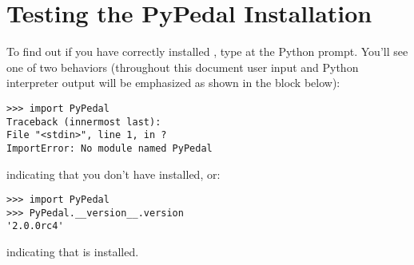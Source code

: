 \section{Testing the PyPedal Installation}\label{sec:installation-testing}
To find out if you have correctly installed \PyPedal{}, type  at the Python prompt. You'll see one of two behaviors (throughout this document user input and Python interpreter output will be emphasized
as shown in the block below):
\begin{verbatim}
>>> import PyPedal
Traceback (innermost last):
File "<stdin>", line 1, in ?
ImportError: No module named PyPedal
\end{verbatim}
indicating that you don't have \PyPedal{} installed, or:
\begin{verbatim}
>>> import PyPedal
>>> PyPedal.__version__.version
'2.0.0rc4'
\end{verbatim}
indicating that \PyPedal{} is installed.
